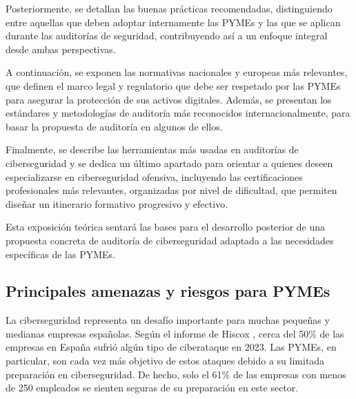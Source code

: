 \documentclass[a4paper, 11pt]{article}
\begin{document}
\par\vspace{0.5cm}

Posteriormente, se detallan las buenas prácticas recomendadas, distinguiendo entre aquellas que deben adoptar internamente las PYMEs y las que se aplican durante las auditorías de seguridad, contribuyendo así a un enfoque integral desde ambas perspectivas.

\par\vspace{0.5cm}

A continuación, se exponen las normativas nacionales y europeas más relevantes, que definen el marco legal y regulatorio que debe ser respetado por las PYMEs para asegurar la protección de sus activos 
digitales. Además, se presentan los estándares y metodologías de auditoría más reconocidos internacionalmente, para basar la propuesta de auditoría en algunos de ellos.

\par\vspace{0.5cm}


Finalmente, se describe las herramientas más usadas en auditorías de ciberseguridad y se dedica un último apartado para orientar a quienes deseen especializarse en ciberseguridad ofensiva, incluyendo las certificaciones profesionales más relevantes, organizadas por nivel de dificultad, que permiten diseñar un itinerario formativo progresivo y efectivo.
\par\vspace{0.5cm}

Esta exposición teórica sentará las bases para el desarrollo posterior de una propuesta concreta de auditoría de ciberseguridad adaptada a las necesidades específicas de las PYMEs.








\par\vspace{0.5cm}







\subsection{Principales amenazas y riesgos para PYMEs}
\par\vspace{0.5cm}

La ciberseguridad representa un desafío importante para muchas pequeñas y medianas empresas españolas. Según el informe de Hiscox \cite{hiscox}, cerca del 50\% de las empresas en España sufrió algún tipo de ciberataque en 2023. Las PYMEs, en particular, son cada vez más objetivo de estos ataques debido a su limitada preparación en ciberseguridad. De hecho, solo el 61\% de las empresas con menos de 250 empleados se sienten seguras de su preparación en este sector. 
\par\vspace{0.5cm}
\end{document}
